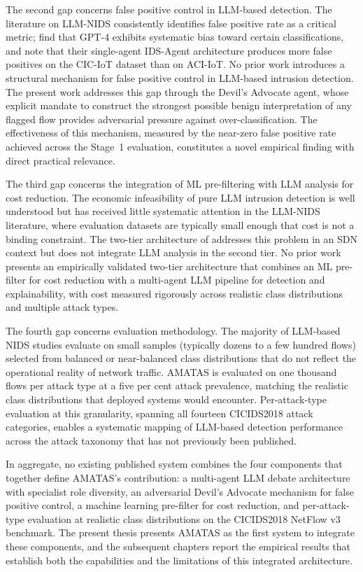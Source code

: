 The second gap concerns false positive control in LLM-based detection. The literature on LLM-NIDS consistently identifies false positive rate as a critical metric; \textcite{Houssel2024} find that GPT-4 exhibits systematic bias toward certain classifications, and \textcite{Li2024} note that their single-agent IDS-Agent architecture produces more false positives on the CIC-IoT dataset than on ACI-IoT. No prior work introduces a structural mechanism for false positive control in LLM-based intrusion detection. The present work addresses this gap through the Devil's Advocate agent, whose explicit mandate to construct the strongest possible benign interpretation of any flagged flow provides adversarial pressure against over-classification. The effectiveness of this mechanism, measured by the near-zero false positive rate achieved across the Stage~1 evaluation, constitutes a novel empirical finding with direct practical relevance.

The third gap concerns the integration of ML pre-filtering with LLM analysis for cost reduction. The economic infeasibility of pure LLM intrusion detection is well understood but has received little systematic attention in the LLM-NIDS literature, where evaluation datasets are typically small enough that cost is not a binding constraint. The two-tier architecture of \textcite{Kalafatidis2025} addresses this problem in an SDN context but does not integrate LLM analysis in the second tier. No prior work presents an empirically validated two-tier architecture that combines an ML pre-filter for cost reduction with a multi-agent LLM pipeline for detection and explainability, with cost measured rigorously across realistic class distributions and multiple attack types.

The fourth gap concerns evaluation methodology. The majority of LLM-based NIDS studies evaluate on small samples (typically dozens to a few hundred flows) selected from balanced or near-balanced class distributions that do not reflect the operational reality of network traffic. AMATAS is evaluated on one thousand flows per attack type at a five per cent attack prevalence, matching the realistic class distributions that deployed systems would encounter. Per-attack-type evaluation at this granularity, spanning all fourteen CICIDS2018 attack categories, enables a systematic mapping of LLM-based detection performance across the attack taxonomy that has not previously been published.

In aggregate, no existing published system combines the four components that together define AMATAS's contribution: a multi-agent LLM debate architecture with specialist role diversity, an adversarial Devil's Advocate mechanism for false positive control, a machine learning pre-filter for cost reduction, and per-attack-type evaluation at realistic class distributions on the CICIDS2018 NetFlow v3 benchmark. The present thesis presents AMATAS as the first system to integrate these components, and the subsequent chapters report the empirical results that establish both the capabilities and the limitations of this integrated architecture.
